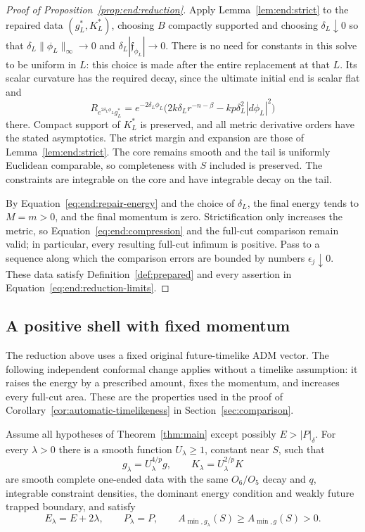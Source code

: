 \begin{proof}[Proof of Proposition~\ref{prop:end:reduction}]
Apply Lemma~\ref{lem:end:strict} to the repaired data
$(g_L^*,K_L^*)$, choosing $B$ compactly supported and choosing
$\delta_L\downarrow0$ so that
$\delta_L\|\phi_L\|_\infty\to0$ and
$\delta_L|\mathfrak f_{\phi_L}|\to0$.
There is no need for constants in this solve to be uniform in
$L$: this choice is made after the entire replacement at that
$L$.  Its scalar curvature has the required decay, since the
ultimate initial end is scalar flat and
\[
 R_{e^{2\delta_L\phi_L}g_L^*}
 =e^{-2\delta_L\phi_L}
       \bigl(2k\delta_L r^{-n-\beta}
                         -kp\delta_L^2|d\phi_L|^2\bigr)
\]
there.  Compact support of $K_L^*$ is preserved, and all metric
derivative orders have the stated asymptotics.  The strict
margin and expansion are those of
Lemma~\ref{lem:end:strict}.  The core remains smooth and the
tail is uniformly Euclidean comparable, so completeness with
$S$ included is preserved.  The constraints are integrable
on the core and have integrable decay on the tail.

By Equation~\eqref{eq:end:repair-energy} and the choice of
$\delta_L$, the final energy tends to $M=m>0$, and the final
momentum is zero. Strictification only increases the metric,
so Equation~\eqref{eq:end:compression} and the full-cut
comparison remain valid; in particular, every resulting full-cut
infimum is positive. Pass to a sequence along which the comparison
errors are bounded by numbers $\epsilon_j\downarrow0$.
These data satisfy Definition~\ref{def:prepared} and every assertion
in Equation~\eqref{eq:end:reduction-limits}.
\end{proof}

\subsection{A positive shell with fixed momentum}

The reduction above uses a fixed original future-timelike ADM vector.
The following independent conformal change applies without a timelike
assumption: it raises the energy by a prescribed amount, fixes the
momentum, and increases every full-cut area. These are the properties
used in the proof of Corollary~\ref{cor:automatic-timelikeness} in
Section~\ref{sec:comparison}.

\begin{lemma}
\label{lem:end:positive-shell}
Assume all hypotheses of Theorem~\ref{thm:main} except possibly
$E>|P|_\delta$. For every $\lambda>0$ there is a smooth function
$U_\lambda\ge1$, constant near $S$, such that
\[
 g_\lambda=U_\lambda^{4/p}g,\qquad
 K_\lambda=U_\lambda^{2/p}K
\]
are smooth complete one-ended data with the same $O_6/O_5$ decay and $q$,
integrable constraint densities, the dominant energy condition and weakly
future trapped boundary, and satisfy
\[
 E_\lambda=E+2\lambda,\qquad P_\lambda=P,\qquad
 A_{\min,g_\lambda}(S)\ge A_{\min,g}(S)>0.
\]
\end{lemma}

